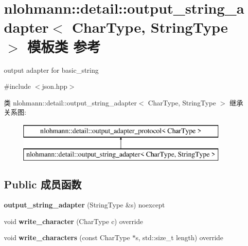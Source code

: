 \hypertarget{classnlohmann_1_1detail_1_1output__string__adapter}{}\section{nlohmann\+::detail\+::output\+\_\+string\+\_\+adapter$<$ Char\+Type, String\+Type $>$ 模板类 参考}
\label{classnlohmann_1_1detail_1_1output__string__adapter}


output adapter for basic\+\_\+string  




{\ttfamily \#include $<$json.\+hpp$>$}

类 nlohmann\+::detail\+::output\+\_\+string\+\_\+adapter$<$ Char\+Type, String\+Type $>$ 继承关系图\+:\begin{figure}[H]
\begin{center}
\leavevmode
\includegraphics[height=2.000000cm]{classnlohmann_1_1detail_1_1output__string__adapter}
\end{center}
\end{figure}
\subsection*{Public 成员函数}
\begin{DoxyCompactItemize}
\item 
\mbox{\label{classnlohmann_1_1detail_1_1output__string__adapter_af3a49ecd0d23fe56ac21e13d8752abc7}} 
{\bfseries output\+\_\+string\+\_\+adapter} (String\+Type \&s) noexcept
\item 
\mbox{\label{classnlohmann_1_1detail_1_1output__string__adapter_a2d76cc6c88ddbc196a63fcfcac9ee7d1}} 
void {\bfseries write\+\_\+character} (Char\+Type c) override
\item 
\mbox{\label{classnlohmann_1_1detail_1_1output__string__adapter_ab5ea4da075305d225dfd84ad997e8747}} 
void {\bfseries write\+\_\+characters} (const Char\+Type $\ast$s, std\+::size\+\_\+t length) override
\end{DoxyCompactItemize}


